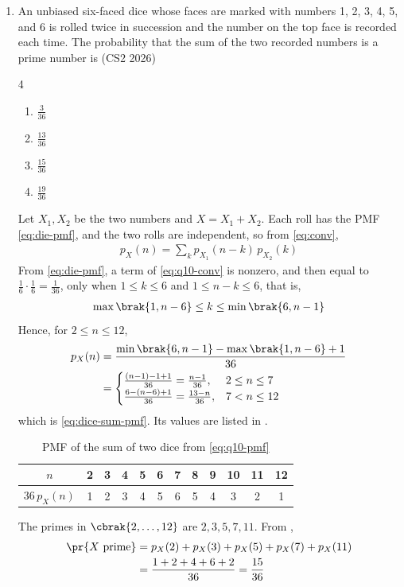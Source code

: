\begin{enumerate}[label=\thesubsection.\arabic*, ref=\thesubsection.\theenumi]
\item An unbiased six-faced dice whose faces are marked with numbers 1, 2,
3, 4, 5, and 6 is rolled twice in succession and the number on the top face
is recorded each time. The probability that the sum of the two recorded
numbers is a prime number is \underline{\hspace{1.5cm}}
\hfill (CS2 2026)
\begin{multicols}{4}
\begin{enumerate}[label=\roman*)]
  \item $\frac{3}{36}$
  \item $\frac{13}{36}$
  \item $\frac{15}{36}$
  \item $\frac{19}{36}$
\end{enumerate}
\end{multicols}
\solution Let $X_1, X_2$ be the two numbers and $X = X_1 + X_2$. Each roll
has the PMF \eqref{eq:die-pmf}, and the two rolls are independent, so from
\eqref{eq:conv},
\begin{align}
p_X(n) = \sum_{k} p_{X_1}(n - k)\, p_{X_2}(k)
\label{eq:q10-conv}
\end{align}
From \eqref{eq:die-pmf}, a term of \eqref{eq:q10-conv} is nonzero, and then
equal to $\frac{1}{6}\cdot\frac{1}{6} = \frac{1}{36}$, only when
$1 \le k \le 6$ and $1 \le n - k \le 6$, that is,
\begin{align}
\max\brak{1, n - 6} \le k \le \min\brak{6, n - 1}
\end{align}
Hence, for $2 \le n \le 12$,
\begin{align}
p_X(n) &= \frac{\min\brak{6, n - 1} - \max\brak{1, n - 6} + 1}{36} \\
&= \begin{cases}
\frac{(n - 1) - 1 + 1}{36} = \frac{n - 1}{36}, & 2 \le n \le 7 \\
\frac{6 - (n - 6) + 1}{36} = \frac{13 - n}{36}, & 7 < n \le 12
\end{cases}
\label{eq:q10-pmf}
\end{align}
which is \eqref{eq:dice-sum-pmf}. Its values are listed in
.
\begin{table}[H]
\centering
\begin{tabular}{|c|ccccccccccc|}
\hline
$n$ & 2 & 3 & 4 & 5 & 6 & 7 & 8 & 9 & 10 & 11 & 12 \\
\hline
$36\, p_X(n)$ & 1 & 2 & 3 & 4 & 5 & 6 & 5 & 4 & 3 & 2 & 1 \\
\hline
\end{tabular}
\caption{PMF of the sum of two dice from \eqref{eq:q10-pmf}}
\label{tab:q10-pmf}
\end{table}
The primes in $\cbrak{2, \dots, 12}$ are $2, 3, 5, 7, 11$. From
,
\begin{align}
\pr{X \text{ prime}} &= p_X(2) + p_X(3) + p_X(5) + p_X(7) + p_X(11) \\
&= \frac{1 + 2 + 4 + 6 + 2}{36} = \frac{15}{36}
\end{align}


\end{enumerate}
